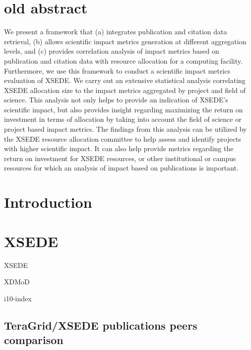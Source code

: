\documentclass{sig-alternate}
\begin{document}
\section{old abstract}

We present a framework that (a) integrates publication and citation
data retrieval, (b) allows scientific impact metrics generation at
different aggregation levels, and (c) provides correlation analysis of
impact metrics based on publication and citation data with resource
allocation for a computing facility. Furthermore, we use this
framework to conduct a scientific impact metrics evaluation of XSEDE.
We carry out an extensive statistical analysis correlating XSEDE
allocation size to the impact metrics aggregated by project and field
of science. This analysis not only helps to provide an indication of
XSEDE's scientific impact, but also provides insight regarding
maximizing the return on investment in terms of allocation by taking
into account the field of science or project based impact metrics. The
findings from this analysis can be utilized by the XSEDE resource
allocation committee to help assess and identify projects with higher
scientific impact. It can also help provide metrics regarding the
return on investment for XSEDE resources, or other institutional or
campus resources for which an analysis of impact based on publications
is important.
 





\section{Introduction}



\section{XSEDE}

XSEDE \cite{www-xsede} 

 XDMoD \cite{Furlani:2013:UXF:2484762.2484763} 

i10-index \cite{www-i10index}

\subsection{TeraGrid/XSEDE publications peers comparison}
\end{document}
